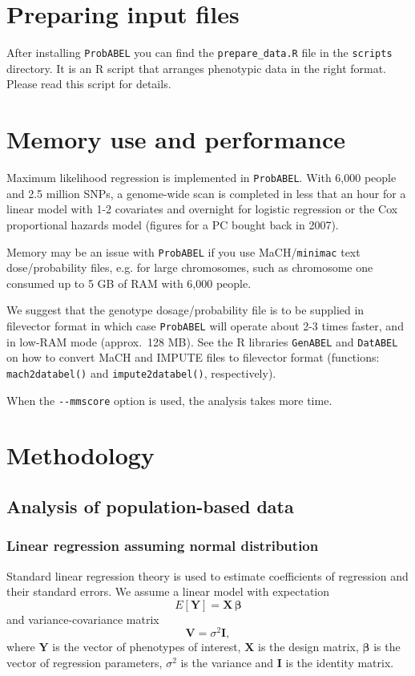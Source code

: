 \documentclass[12pt,a4paper]{article}
\newcommand{\PA}{\texttt{ProbABEL}}
\newcommand{\GA}{\texttt{GenABEL}}
\newcommand{\DA}{\texttt{DatABEL}}
\begin{document}
\section{Preparing input files}
After installing \PA{} you can find the \texttt{prepare\_data.R} file
in the \texttt{scripts} directory. It is an R script that arranges
phenotypic data in the right format. Please read this script for
details.

\section{Memory use and performance}
Maximum likelihood regression is implemented in
\PA{}. With 6,000 people and 2.5 million SNPs, a
genome-wide scan is completed in less that an hour for a linear model
with 1-2 covariates and overnight for logistic regression or the Cox
proportional hazards model (figures for a PC bought back in 2007).

Memory may be an issue with \PA{} if you use MaCH/\texttt{minimac}
text dose/probability files, e.g. for large chromosomes, such as
chromosome one consumed up to 5 GB of RAM with 6,000 people.

We suggest that the genotype dosage/probability file is to be supplied
in filevector format in which case \PA{} will operate about 2-3 times
faster, and in low-RAM mode (approx.~128 MB). See the R libraries
\GA{} and \DA{} on how to convert MaCH and IMPUTE files to filevector
format (functions: \texttt{mach2databel()} and
\texttt{impute2databel()}, respectively).

When the \lstinline{--mmscore} option is used, the analysis takes
more time.

\section{Methodology}
\label{sec:methodology}
\subsection{Analysis of population-based data}
\subsubsection{Linear regression assuming normal distribution}
Standard linear regression theory is used to estimate coefficients of
regression and their standard errors. We assume a linear model with
expectation
\begin{equation}
  E[\mathbf{Y}] = \mathbf{X}\, \boldsymbol{\beta}
\label{eq:expectation}
\end{equation}
and variance-covariance matrix
$$
\mathbf{V} = \sigma^2 \mathbf{I},
$$
where $\mathbf{Y}$ is the vector of phenotypes of interest,
$\mathbf{X}$ is the design matrix, $\boldsymbol{\beta}$ is the vector
of regression parameters, $\sigma^2$ is the variance and $\mathbf{I}$
is the identity matrix.
\end{document}
